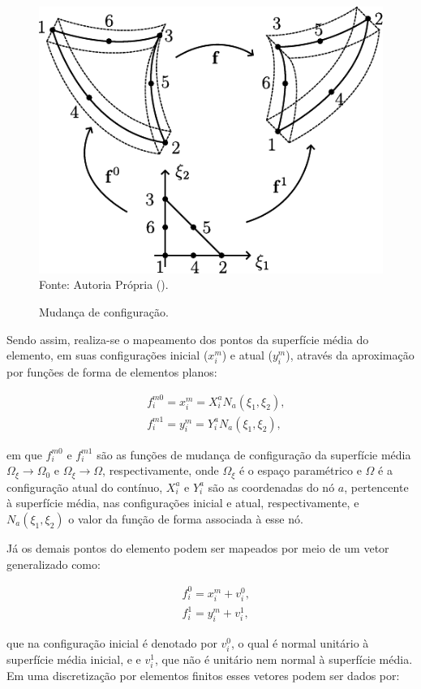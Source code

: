 \begin{figure}[h!]
    \centering
    \caption{Mudança de configuração.}
    \includegraphics[width=.4\linewidth]{Figuras/Mapeamento.pdf}
    \\Fonte: Autoria Própria (\the\year).
    \label{fig:Mapeamento}
\end{figure}

Sendo assim, realiza-se o mapeamento dos pontos da superfície média do elemento, em suas configurações inicial ($x_i^m$) e atual ($y_i^m$), através da aproximação por funções de forma de elementos planos:

\begin{subequations}
    \begin{align}
         & f_i^{m0}=x_i^m=X_i^aN_a(\xi_1,\xi_2)\text{,} \\
         & f_i^{m1}=y_i^m=Y_i^aN_a(\xi_1,\xi_2)\text{,}
    \end{align}
\end{subequations}

\noindent em que $f_i^{m0}$ e $f_i^{m1}$ são as funções de mudança de configuração da superfície média $\Omega_\xi\to\Omega_0$ e $\Omega_\xi\to\Omega$, respectivamente, onde $\Omega_\xi$ é o espaço paramétrico e $\Omega$ é a configuração atual do contínuo, $X_i^a$ e $Y_i^a$ são as coordenadas do nó $a$, pertencente à superfície média, nas configurações inicial e atual, respectivamente, e $N_a(\xi_1,\xi_2)$ o valor da função de forma associada à esse nó.

Já os demais pontos do elemento podem ser mapeados por meio de um vetor generalizado como:

\begin{subequations}
    \begin{align}
         & f_i^0=x_i^m+v_i^0\text{,} \\
         & f_i^1=y_i^m+v_i^1\text{,}
    \end{align}
\end{subequations}

\noindent que na configuração inicial é denotado por $v_i^0$, o qual é normal unitário à superfície média inicial, e e $v_i^1$, que não é unitário nem normal à superfície média. Em uma discretização por elementos finitos esses vetores podem ser dados por:


